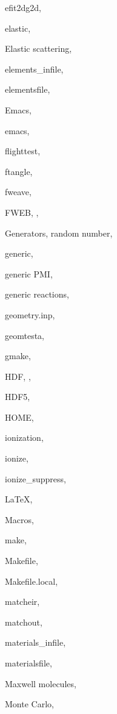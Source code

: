\documentclass[12pt]{report}
\begin{document}
\begin{theindex}
  \indexspace

  \item efit2dg2d, 
  \item elastic, 
  \item Elastic scattering, 
  \item elements\_infile, 
  \item elementsfile, 
  \item Emacs, 
  \item emacs, 

  \indexspace

  \item flighttest, 
  \item ftangle, 
  \item fweave, 
  \item FWEB, , 

  \indexspace

  \item Generators, random number, 
  \item generic, 
  \item generic PMI, 
  \item generic reactions, 
  \item geometry.inp, 
  \item geomtesta, 
  \item gmake, 

  \indexspace

  \item HDF, , 
  \item HDF5, 
  \item HOME, 

  \indexspace

  \item ionization, 
  \item ionize, 
  \item ionize\_suppress, 

  \indexspace

  \item LaTeX, 

  \indexspace

  \item Macros, 
  \item make, 
  \item Makefile, 
  \item Makefile.local, 
  \item matcheir, 
  \item matchout, 
  \item materials\_infile, 
  \item materialsfile, 
  \item Maxwell molecules, 
  \item Monte Carlo, 


\end{theindex}
\end{document}
